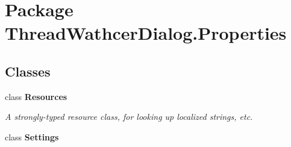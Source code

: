 \hypertarget{namespace_thread_wathcer_dialog_1_1_properties}{\section{Package Thread\+Wathcer\+Dialog.\+Properties}
\label{namespace_thread_wathcer_dialog_1_1_properties}
}
\subsection*{Classes}
\begin{DoxyCompactItemize}
\item 
class {\bfseries Resources}
\begin{DoxyCompactList}\small\item\em A strongly-\/typed resource class, for looking up localized strings, etc. \end{DoxyCompactList}\item 
class {\bfseries Settings}
\end{DoxyCompactItemize}
